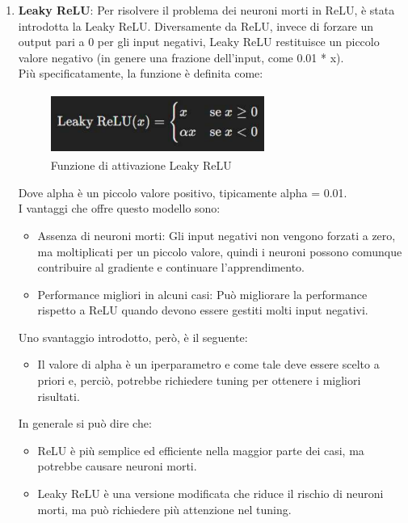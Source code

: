 \documentclass[12pt,a4paper,openright,twoside]{book}
\begin{document}
\begin{enumerate}
\item \textbf{Leaky ReLU}:
Per risolvere il problema dei neuroni morti in ReLU, è stata introdotta la Leaky ReLU.  Diversamente da ReLU, invece di forzare un output pari a 0 per gli input negativi, Leaky ReLU restituisce un piccolo valore negativo (in genere una frazione dell'input, come 0.01 * x).\\
Più specificatamente, la funzione è definita come:

\begin{figure}[H]
  	\centering
    	\includegraphics[height=2cm, width= 7cm]{figures/leaky.pdf}
    	\caption{Funzione di attivazione Leaky ReLU}
	\label{fig:leaky}
\end{figure} 
Dove alpha è un piccolo valore positivo, tipicamente alpha = 0.01.\\

I vantaggi che offre questo modello sono:
\begin{itemize}
\item Assenza di neuroni morti: Gli input negativi non vengono forzati a zero, ma moltiplicati per un piccolo valore, quindi i neuroni possono comunque contribuire al gradiente e continuare l'apprendimento.
\item Performance migliori in alcuni casi: Può migliorare la performance rispetto a ReLU quando devono essere gestiti molti input negativi.
\end{itemize}

Uno svantaggio introdotto, però, è il seguente:
\begin{itemize}
\item Il valore di alpha  è un iperparametro e come tale deve essere scelto a priori e, perciò, potrebbe richiedere tuning per ottenere i migliori risultati.
\end{itemize}

In generale si può dire che:
\begin{itemize}
\item ReLU è più semplice ed efficiente nella maggior parte dei casi, ma potrebbe causare neuroni morti.
\item Leaky ReLU è una versione modificata che riduce il rischio di neuroni morti, ma può richiedere più attenzione nel tuning.
\end{itemize}
\end{enumerate}
\end{document}
